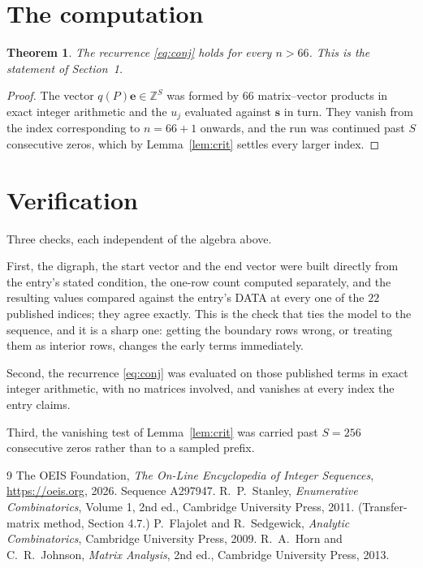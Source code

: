\documentclass[11pt,a4paper]{article}
\theoremstyle{plain}
\newtheorem{theorem}{Theorem}
\theoremstyle{definition}
\begin{document}
\section{The computation}

\begin{theorem}
The recurrence \eqref{eq:conj} holds for every $n>66$. This is the statement of
Section~1.
\end{theorem}

\begin{proof}
The vector $q(P)\mathbf{e}\in\mathbb{Z}^{S}$ was formed by $66$ matrix--vector
products in exact integer arithmetic and the $u_j$ evaluated against $\mathbf{s}$ in turn.
They vanish from the index corresponding to $n=66+1$ onwards, and the run was continued
past $S$ consecutive zeros, which by Lemma~\ref{lem:crit} settles every larger index.
\end{proof}

\section{Verification}

Three checks, each independent of the algebra above.

First, the digraph, the start vector and the end vector were built directly from the
entry's stated condition, the one-row count computed separately, and the resulting values
compared against the entry's DATA at every one of the $22$ published indices; they
agree exactly. This is the check that ties the model to the sequence, and it is a sharp one:
getting the boundary rows wrong, or treating them as interior rows, changes the early terms
immediately.

Second, the recurrence \eqref{eq:conj} was evaluated on those published terms in exact
integer arithmetic, with no matrices involved, and vanishes at every index the entry claims.

Third, the vanishing test of Lemma~\ref{lem:crit} was carried past $S=256$ consecutive
zeros rather than to a sampled prefix.

\begin{thebibliography}{9}
 The OEIS Foundation, \emph{The On-Line Encyclopedia of Integer
Sequences}, \url{https://oeis.org}, 2026. Sequence A297947.
 R.~P.~Stanley, \emph{Enumerative Combinatorics}, Volume 1, 2nd ed.,
Cambridge University Press, 2011. (Transfer-matrix method, Section 4.7.)
 P.~Flajolet and R.~Sedgewick, \emph{Analytic Combinatorics}, Cambridge
University Press, 2009.
 R.~A.~Horn and C.~R.~Johnson, \emph{Matrix Analysis}, 2nd ed., Cambridge
University Press, 2013.
\end{thebibliography}
\end{document}
